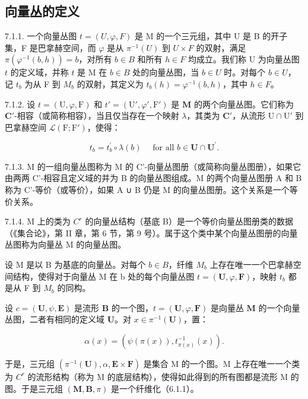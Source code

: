 \subsection{向量丛的定义}

7.1.1. 一个向量丛图 \(t = (U, \varphi, F)\) 是 M 的一个三元组，其中 U 是 B 的开子集，F 是巴拿赫空间，而 \(\varphi\) 是从 \(\pi^{-1}(U)\) 到 \(U \times F\) 的双射，满足 \(\pi(\varphi^{-1}(b, h)) = b\)，对所有 \(b \in B\) 和所有 \(h \in F\) 均成立。我们称 U 为向量丛图 \(t\) 的定义域，并称 \(t\) 是 M 在 \(b \in B\) 处的向量丛图，当 \(b \in U\) 时。对每个 \(b \in U\)，记 \(t_b\) 为从 F 到 \(M_b\) 的双射，其定义为 \(t_b(h) = \varphi^{-1}(b, h)\)，其中 \(h \in F\)。

7.1.2. 设 \(t = (\mathrm{U}, \varphi, \mathrm{F})\) 和 \(t' = (\mathrm{U}', \varphi', \mathrm{F}')\) 是 \(\mathbf{M}\) 的两个向量丛图。它们称为 \(\mathbf{C}'\)-相容（或简称相容），当且仅当存在一个映射 \(\lambda\)，其类为 \(\mathbf{C}'\)，从流形 \(\mathrm{U} \cap \mathrm{U}'\) 到巴拿赫空间 \(\mathcal{L}(\mathrm{F}; \mathrm{F}')\)，使得：

\[
t _ {b} = t _ {b} ^ {\prime} \circ \lambda (b) \quad \text { for all } b \in \mathbf {U} \cap \mathbf {U} ^ {\prime}.
\]

7.1.3. M 的一组向量丛图称为 M 的 C'-向量丛图册（或简称向量丛图册），如果它由两两 C'-相容且定义域的并为 B 的向量丛图组成。M 的两个向量丛图册 A 和 B 称为 C'-等价（或等价），如果 A ∪ B 仍是 M 的向量丛图册。这个关系是一个等价关系。

7.1.4. M 上的类为 \(C^{r}\) 的向量丛结构（基底 B）是一个等价向量丛图册类的数据（《集合论》，第 II 章，第 6 节，第 9 号）。属于这个类中某个向量丛图册的向量丛图称为向量丛 M 的向量丛图。

设 M 是以 B 为基底的向量丛。对每个 \(b \in B\)，纤维 \(M_{b}\) 上存在唯一一个巴拿赫空间结构，使得对于向量丛 M 在 b 处的每个向量丛图 \(t = (\mathbf{U}, \varphi, \mathbf{F})\)，映射 \(t_{b}\) 都是从 F 到 \(M_{b}\) 的同构。

设 \(c = (\mathbf{U}, \psi, \mathbf{E})\) 是流形 \(\mathbf{B}\) 的一个图，\(t = (\mathbf{U}, \varphi, \mathbf{F})\) 是向量丛 \(\mathbf{M}\) 的一个向量丛图，二者有相同的定义域 \(\mathbf{U}\)。对 \(x \in \pi^{-1}(\mathbf{U})\)，置：

\[
\alpha (x) = (\psi (\pi (x)), t _ {\pi (x)} ^ {- 1} (x)).
\]

于是，三元组 \((\pi^{-1}(\mathbf{U}), \alpha, \mathbf{E} \times \mathbf{F})\) 是集合 M 的一个图。M 上存在唯一一个类为 \(C^{r}\) 的流形结构（称为 M 的底层结构），使得如此得到的所有图都是流形 M 的图。于是三元组 \((\mathbf{M}, \mathbf{B}, \pi)\) 是一个纤维化（6.1.1）。

